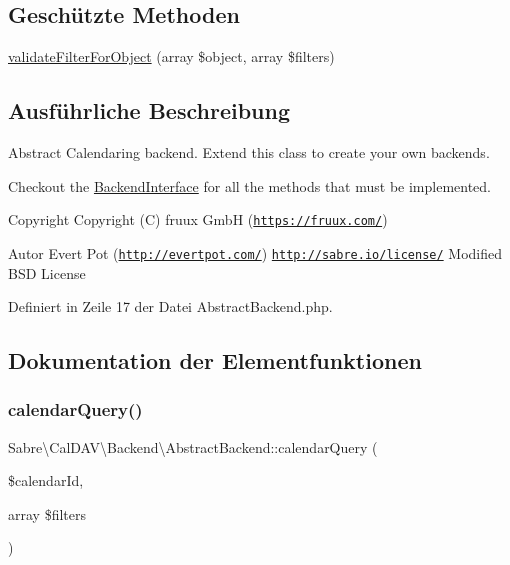 \subsection*{Geschützte Methoden}
\begin{DoxyCompactItemize}
\item 
\mbox{\hyperlink{class_sabre_1_1_cal_d_a_v_1_1_backend_1_1_abstract_backend_a5cc13dcccf6fe380e9c44a2129e3b252}{validate\+Filter\+For\+Object}} (array \$object, array \$filters)
\end{DoxyCompactItemize}


\subsection{Ausführliche Beschreibung}
Abstract Calendaring backend. Extend this class to create your own backends.

Checkout the \mbox{\hyperlink{interface_sabre_1_1_cal_d_a_v_1_1_backend_1_1_backend_interface}{Backend\+Interface}} for all the methods that must be implemented.

\begin{DoxyCopyright}{Copyright}
Copyright (C) fruux GmbH (\href{https://fruux.com/}{\tt https\+://fruux.\+com/}) 
\end{DoxyCopyright}
\begin{DoxyAuthor}{Autor}
Evert Pot (\href{http://evertpot.com/}{\tt http\+://evertpot.\+com/})  \href{http://sabre.io/license/}{\tt http\+://sabre.\+io/license/} Modified B\+SD License 
\end{DoxyAuthor}


Definiert in Zeile 17 der Datei Abstract\+Backend.\+php.



\subsection{Dokumentation der Elementfunktionen}
\mbox{\label{class_sabre_1_1_cal_d_a_v_1_1_backend_1_1_abstract_backend_a6da1dc50d10765046142ce703bc44925}} 
\subsubsection{\texorpdfstring{calendar\+Query()}{calendarQuery()}}
{\footnotesize\ttfamily Sabre\textbackslash{}\+Cal\+D\+A\+V\textbackslash{}\+Backend\textbackslash{}\+Abstract\+Backend\+::calendar\+Query (\begin{DoxyParamCaption}\item[{}]{\$calendar\+Id,  }\item[{array}]{\$filters }\end{DoxyParamCaption})}


